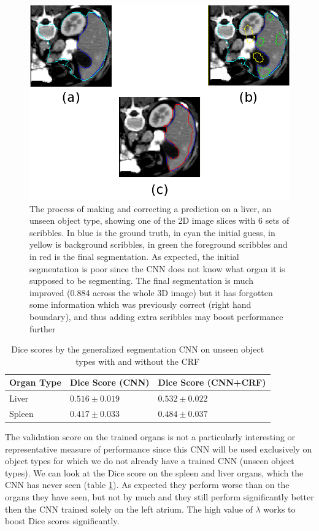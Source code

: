 \begin{figure}[h!]
\centering
\includegraphics[scale=0.4]{pictures/genBIFSEG.png}
\caption{The process of making and correcting a prediction on a liver, an unseen object type, showing one of the 2D image slices with 6 sets of scribbles. In blue is the ground truth, in cyan the initial guess, in yellow is background scribbles, in green the foreground scribbles and in red is the final segmentation. As expected, the initial segmentation is poor since the CNN does not know what organ it is supposed to be segmenting. The final segmentation  is much improved (0.884 across the whole 3D image) but it has forgotten some information which was previously correct (right hand boundary), and thus adding extra scribbles may boost performance further}
\label{fig:genBIFSeg}
\end{figure}


\begin{table}[h!]
\centering
\begin{tabular}{|l|l|l|}
\hline
Organ Type   & Dice Score (CNN)  & Dice Score (CNN+CRF) \\ \hline
Liver        & $0.516 \pm 0.019$ & $0.532 \pm 0.022$\\ 
Spleen       & $0.417 \pm 0.033$ & $0.484 \pm 0.037$ \\ \hline
\end{tabular}
\caption{Dice scores by the generalized segmentation CNN on unseen object types with and without the CRF}
\label{tab:resGenUnseen}
\end{table}

The validation score on the trained organs is not a particularly interesting or representative measure of performance since this CNN will be used exclusively on object types for which we do not already have a trained CNN (unseen object types). We can look at the Dice score on the spleen and liver organs, which the CNN has never seen (table \ref{tab:resGenUnseen}). As expected they perform worse than on the organs they have seen, but not by much and they still perform significantly better then the CNN trained solely on the left atrium. The high value of $\lambda$ works to boost Dice scores significantly. 

